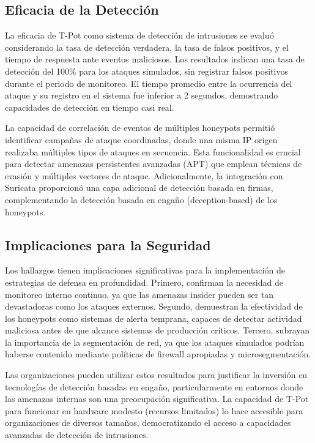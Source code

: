 \subsection{Eficacia de la Detección}

La eficacia de T-Pot como sistema de detección de intrusiones se evaluó considerando la tasa de detección verdadera, la tasa de falsos positivos, y el tiempo de respuesta ante eventos maliciosos. Los resultados indican una tasa de detección del 100\% para los ataques simulados, sin registrar falsos positivos durante el periodo de monitoreo. El tiempo promedio entre la ocurrencia del ataque y su registro en el sistema fue inferior a 2 segundos, demostrando capacidades de detección en tiempo casi real.

La capacidad de correlación de eventos de múltiples honeypots permitió identificar campañas de ataque coordinadas, donde una misma IP origen realizaba múltiples tipos de ataques en secuencia. Esta funcionalidad es crucial para detectar amenazas persistentes avanzadas (APT) que emplean técnicas de evasión y múltiples vectores de ataque. Adicionalmente, la integración con Suricata proporcionó una capa adicional de detección basada en firmas, complementando la detección basada en engaño (deception-based) de los honeypots.

\subsection{Implicaciones para la Seguridad}

Los hallazgos tienen implicaciones significativas para la implementación de estrategias de defensa en profundidad. Primero, confirman la necesidad de monitoreo interno continuo, ya que las amenazas insider pueden ser tan devastadoras como los ataques externos. Segundo, demuestran la efectividad de los honeypots como sistemas de alerta temprana, capaces de detectar actividad maliciosa antes de que alcance sistemas de producción críticos. Tercero, subrayan la importancia de la segmentación de red, ya que los ataques simulados podrían haberse contenido mediante políticas de firewall apropiadas y microsegmentación.

Las organizaciones pueden utilizar estos resultados para justificar la inversión en tecnologías de detección basadas en engaño, particularmente en entornos donde las amenazas internas son una preocupación significativa. La capacidad de T-Pot para funcionar en hardware modesto (recursos limitados) lo hace accesible para organizaciones de diversos tamaños, democratizando el acceso a capacidades avanzadas de detección de intrusiones.
